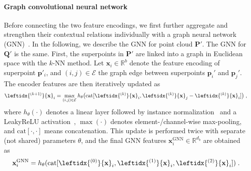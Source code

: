 \paragraph{Graph convolutional neural network}
Before connecting the two feature encodings, we first further aggregate and strengthen their contextual relations individually with a graph neural network (GNN)~\cite{wang2019dynamic}.
In the following, we describe the GNN for point cloud $\mathbf{P}'$.
The GNN for $\mathbf{Q}'$ is the same.
First, the superpoints in $\mathbf{P}'$ are linked into a graph in Euclidean space with the $k$-NN method.
Let ${\mathbf{x}}_i \in \mathbb{R}^{b}$ denote the feature encoding of superpoint $\mathbf{p}'_i$, and $(i,j) \in \mathcal{E}$ the graph edge between superpoints $\mathbf{p}_i'$ and $\mathbf{p}_j'$.
The encoder features are then iteratively updated as
\begin{equation}
    \leftidx{^{(k+1)}}{\mathbf{x}}_i = \max_{(i,j)\in\mathcal{E}} h_\theta\big( \mathrm{cat}[\leftidx{^{(k)}}{\mathbf{x}}_i, \leftidx{^{(k)}}{\mathbf{x}}_j - \leftidx{^{(k)}}{\mathbf{x}}_i]\big)\;,
\end{equation}
where $h_\theta(\cdot)$ denotes a linear layer followed by instance normalization~\cite{ulyanov2016instance} and a LeakyReLU activation~\cite{maas2013rectifier}, $\max(\cdot)$ denotes  element-/channel-wise max-pooling, and $\mathrm{cat}[\cdot,\cdot]$ means concatenation. This update is performed twice with separate (not shared) parameters $\theta$, and the final GNN features ${\mathbf{x}}_i^{\mathrm{GNN}} \in \mathbb{R}^{d_b}$ are obtained as
\begin{equation}
    {\mathbf{x}}_i^{\mathrm{GNN}} =  h_\theta(\text{cat}[\leftidx{^{(0)}}{\mathbf{x}}_i, \leftidx{^{(1)}}{\mathbf{x}}_i,
    \leftidx{^{(2)}}{\mathbf{x}}_i])\;.
\end{equation}

